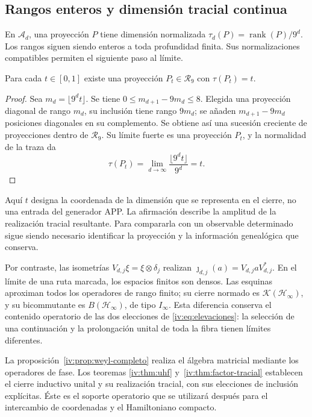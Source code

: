 \subsection{Rangos enteros y dimensión tracial continua}

En \(\mathcal A_d\), una proyección \(P\) tiene dimensión
normalizada \(\tau_d(P)=\operatorname{rank}(P)/9^d\).
Los rangos siguen siendo enteros a toda profundidad finita. Sus
normalizaciones compatibles permiten el siguiente paso al límite.

\begin{proposition}
\label{iv:prop:dimension-tracial}
Para cada \(t\in[0,1]\) existe una proyección
\(P_t\in\mathcal R_9\) con \(\tau(P_t)=t\).
\end{proposition}
\begin{proof}
Sea \(m_d=\lfloor9^dt\rfloor\). Se tiene
\(0\leq m_{d+1}-9m_d\leq8\). Elegida una proyección diagonal
de rango \(m_d\), su inclusión tiene rango \(9m_d\); se
añaden \(m_{d+1}-9m_d\) posiciones diagonales en su complemento.
Se obtiene así una sucesión creciente de proyecciones dentro de
\(\mathcal R_9\). Su límite fuerte es una proyección \(P_t\),
y la normalidad de la traza da
\[
 \tau(P_t)=\lim_{d\to\infty}\frac{\lfloor9^dt\rfloor}{9^d}=t.
\]
\end{proof}

Aquí \(t\) designa la coordenada de la dimensión que se representa
en el cierre, no una entrada del generador APP. La afirmación
describe la amplitud de la realización tracial resultante. Para
compararla con un observable determinado sigue siendo necesario
identificar la proyección y la información genealógica que conserva.

Por contraste, las isometrías
\(V_{d,j}\xi=\xi\otimes\delta_j\) realizan
\(\jmath_{d,j}(a)=V_{d,j}aV_{d,j}^*\). En el límite de una
ruta marcada, los espacios finitos son densos. Las esquinas
aproximan todos los operadores de rango finito; su cierre normado
es \(\mathcal K(\mathcal H_\infty)\), y su bicommutante es
\(B(\mathcal H_\infty)\), de tipo \(I_\infty\). Esta
diferencia conserva el contenido operatorio de las dos elecciones
de \eqref{iv:eq:elevaciones}: la selección de una continuación y
la prolongación unital de toda la fibra tienen límites diferentes.

La proposición~\ref{iv:prop:weyl-completo} realiza el álgebra
matricial mediante los operadores de fase. Los teoremas
\ref{iv:thm:uhf} y~\ref{iv:thm:factor-tracial} establecen el cierre
inductivo unital y su realización tracial, con sus elecciones de
inclusión explícitas. Éste es el soporte operatorio que se utilizará
después para el intercambio de coordenadas y el Hamiltoniano compacto.
